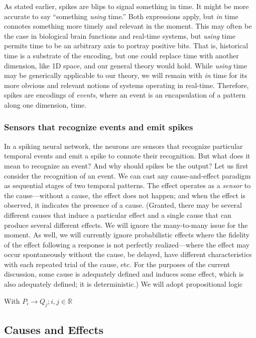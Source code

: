 As stated earlier, spikes are blips to signal something in time.
It might be more accurate to say ``something \emph{using} time.''
Both expressions apply, but \emph{in} time connotes something more timely and relevant in the moment.
This may often be the case in biological brain functions and real-time systems, but \emph{using} time permits time to be an arbitrary axis to portray positive bits.
That is, historical time is a substrate of the encoding, but one could replace time with another dimension, like 1D space, and our general theory would hold.
While \emph{using} time may be generically applicable to our theory, we will remain with \emph{in} time for its more obvious and relevant notions of systems operating in real-time.
Therefore, spikes are encodings of \emph{events}, where an event is an encapsulation of a pattern along one dimension, time.

\subsubsection{Sensors that recognize events and emit spikes}

In a spiking neural network, the neurons are sensors that recognize particular temporal events and emit a spike to connote their recognition.
But what does it mean to recognize an event?
And why should spikes be the output?
Let us first consider the recognition of an event.
We can cast any cause-and-effect paradigm as sequential stages of two temporal patterns.
The effect operates as a \emph{sensor} to the cause---without a cause, the effect does not happen; and when the effect is observed, it indicates the presence of a cause.
(Granted, there may be several different causes that induce a particular effect and a single cause that can produce several different effects.
We will ignore the many-to-many issue for the moment.
As well, we will currently ignore probabilistic effects where the fidelity of the effect following a response is not perfectly realized---where the effect may occur spontaneously without the cause, be delayed, have different characteristics with each repeated trial of the cause, etc.
For the purposes of the current discussion, some cause is adequately defined and induces some effect, which is also adequately defined; it is deterministic.)
We will adopt propositional logic 

With $P_{i} \rightarrow Q_{j}; i,j \in \mathbb{R}$

\subsection{Causes and Effects}

